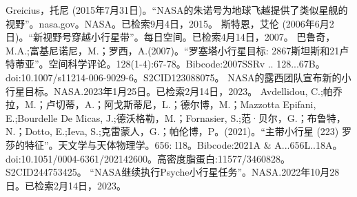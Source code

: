 \begin{enumerate}
 Greicius，托尼 (2015年7月31日)。“NASA的朱诺号为地球飞越提供了类似星舰的视野”。nasa.gov。NASA。已检索9月4日，2015。
 斯特恩，艾伦 (2006年6月2日)。“新视野号穿越小行星带”。每日空间。已检索4月14日，2007。
 巴鲁奇，M.A.;富基尼诺尼，M.；罗西，A.(2007)。“罗塞塔小行星目标: 2867斯坦斯和21卢特蒂亚”。空间科学评论。128(1-4):67-78。Bibcode:2007SSRv .. 128...67B。doi:10.1007/s11214-006-9029-6。S2CID123088075。 
 NASA的露西团队宣布新的小行星目标。NASA.2023年1月25日。已检索2月14日，2023。
 Avdellidou, C.;帕乔拉，M.；卢切蒂，A.；阿戈斯蒂尼，L.；德尔博，M.；Mazzotta Epifani, E.;Bourdelle De Micas, J.;德沃格勒，M.；Fornasier, S.;范·贝尔，G.；布鲁特，N.；Dotto, E.;Ieva, S.;克雷蒙人，G.；帕伦博，P。(2021)。“主带小行星 (223) 罗莎的特征”。天文学与天体物理学。656: l18。Bibcode:2021A & A...656L..18A。doi:10.1051/0004-6361/202142600。高密度脂蛋白:11577/3460828。S2CID244753425。 
 “NASA继续执行Psyche小行星任务”。NASA.2022年10月28日。已检索2月14日，2023。
 \end{enumerate}